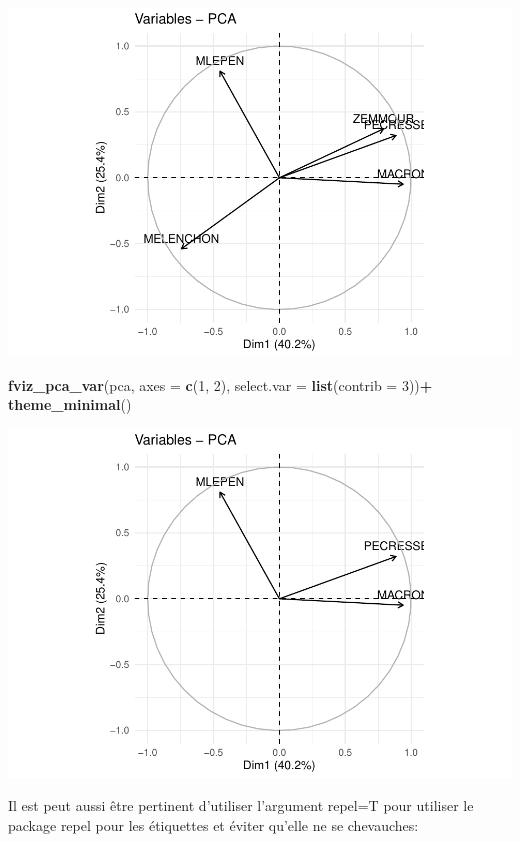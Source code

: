\documentclass[
]{book}
\newenvironment{Shaded}{\begin{snugshade}}{\end{snugshade}}
\newcommand{\AttributeTok}[1]{\textcolor[rgb]{0.13,0.29,0.53}{#1}}
\newcommand{\DecValTok}[1]{\textcolor[rgb]{0.00,0.00,0.81}{#1}}
\newcommand{\FunctionTok}[1]{\textcolor[rgb]{0.13,0.29,0.53}{\textbf{#1}}}
\newcommand{\NormalTok}[1]{#1}
\newcommand{\SpecialCharTok}[1]{\textcolor[rgb]{0.81,0.36,0.00}{\textbf{#1}}}
\begin{document}
\includegraphics{bookdown-demo_files/figure-latex/unnamed-chunk-66-3.pdf}

\begin{Shaded}
\begin{Highlighting}[]
\FunctionTok{fviz\_pca\_var}\NormalTok{(pca,  }\AttributeTok{axes =} \FunctionTok{c}\NormalTok{(}\DecValTok{1}\NormalTok{, }\DecValTok{2}\NormalTok{), }\AttributeTok{select.var =} \FunctionTok{list}\NormalTok{(}\AttributeTok{contrib =} \DecValTok{3}\NormalTok{))}\SpecialCharTok{+} \FunctionTok{theme\_minimal}\NormalTok{()}
\end{Highlighting}
\end{Shaded}

\includegraphics{bookdown-demo_files/figure-latex/unnamed-chunk-66-4.pdf}

Il est peut aussi être pertinent d'utiliser l'argument repel=T pour utiliser le package repel pour les étiquettes et éviter qu'elle ne se chevauches:
\end{document}
